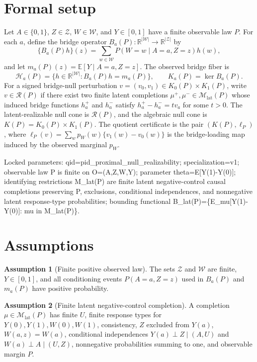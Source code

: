 \documentclass[11pt]{article}
\newcommand{\E}{\mathbb{E}}
\newcommand{\calH}{\mathcal{H}}
\newcommand{\calR}{\mathcal{R}}
\newcommand{\R}{\mathbb{R}}
\theoremstyle{definition}
\newtheorem{assumption}{Assumption}
\theoremstyle{plain}
\theoremstyle{remark}
\begin{document}
\section{Formal setup}
Let \(A\in\{0,1\}\), \(Z\in\mathcal{Z}\), \(W\in\mathcal{W}\), and \(Y\in[0,1]\) have a finite observable law \(P\). For each \(a\), define the bridge operator \(B_a(P):\R^{|\mathcal{W}|}\to\R^{|\mathcal{Z}|}\) by
\[
\{B_a(P)h\}(z)=\sum_{w\in\mathcal{W}}P(W=w\mid A=a,Z=z)h(w),
\]
and let \(m_a(P)(z)=\E[Y\mid A=a,Z=z]\). The observed bridge fiber is
\[
\calH_a(P)=\{h\in\R^{|\mathcal{W}|}:B_a(P)h=m_a(P)\},\qquad
K_a(P)=\ker B_a(P).
\]
For a signed bridge-null perturbation \(v=(v_0,v_1)\in K_0(P)\times K_1(P)\), write \(v\in\calR(P)\) if there exist two finite latent completions \(\mu^+,\mu^-\in\mathcal{M}_{\mathrm{lat}}(P)\) whose induced bridge functions \(h_a^+\) and \(h_a^-\) satisfy \(h_a^+-h_a^-=t v_a\) for some \(t>0\). The latent-realizable null cone is \(\calR(P)\), and the algebraic null cone is \(K(P)=K_0(P)\times K_1(P)\). The quotient certificate is the pair \((K(P),\ell_P)\), where \(\ell_P(v)=\sum_w p_W(w)\{v_1(w)-v_0(w)\}\) is the bridge-loading map induced by the observed marginal \(p_W\).

\begin{center}
\begin{minipage}{0.92\linewidth}
\small\ttfamily
Locked parameters: qid=pid\_proximal\_null\_realizability; specialization=v1; observable law P is finite on O=(A,Z,W,Y); parameter theta=E[Y(1)-Y(0)]; identifying restrictions M\_lat(P) are finite latent negative-control causal completions preserving P, exclusions, conditional independences, and nonnegative latent response-type probabilities; bounding functional B\_lat(P)=\{E\_mu[Y(1)-Y(0)]: mu in M\_lat(P)\}.
\end{minipage}
\end{center}

\section{Assumptions}
\begin{assumption}[Finite positive observed law]\label{ass:finite-positive}
The sets \(\mathcal{Z}\) and \(\mathcal{W}\) are finite, \(Y\in[0,1]\), and all conditioning events \(P(A=a,Z=z)\) used in \(B_a(P)\) and \(m_a(P)\) have positive probability.
\end{assumption}

\begin{assumption}[Finite latent negative-control completion]\label{ass:latent-completion}
A completion \(\mu\in\mathcal{M}_{\mathrm{lat}}(P)\) has finite \(U\), finite response types for \(Y(0),Y(1),W(0),W(1)\), consistency, \(Z\) excluded from \(Y(a)\), \(W(a,z)=W(a)\), conditional independences \(Y(a)\perp Z\mid(A,U)\) and \(W(a)\perp A\mid(U,Z)\), nonnegative probabilities summing to one, and observable margin \(P\).
\end{assumption}
\end{document}
